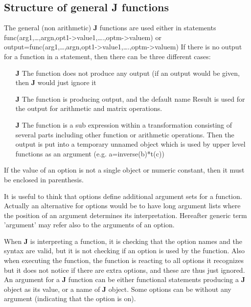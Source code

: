 \subsection{Structure of general \textbf{J} functions}
\label{jfunc}
The general (non arithmetic) \textbf{J} functions are used either in statements
func(arg1,…,argn,opt1->value1,….,optm->valuem)
or
output=func(arg1,…,argn,opt1->value1,….,optm->valuem)
If there is no output for a function in a statement, then there can be three different cases:
\begin{itemize}
\item[\textbf{J}] The function does not produce any output (if an output would be given, then \textbf{J} would just
ignore it
\item[\textbf{J}] The function is producing output, and the default name {Result} is used for the output
for arithmetic and matrix operations.
\item[\textbf{J}] The function is a sub expression within a transformation consisting of several parts including
other function or arithmetic operations. Then the output is put into a temporary unnamed
object which is used by upper level functions as an argument (e.g. a=\textcolor{VioletRed}{inverse}(b)*t(c))
\end{itemize}
If the value of an option is not a single object or numeric constant, then it must be enclosed in
parenthesis.
\begin{note}
It is useful to think that options define additional argument sets for a function. Actually
an alternative for options would be to have long argument lists where the position of an
argument determines its interpretation. Hereafter generic term 'argument' may refer also to
the arguments of an option.
\end{note}
\begin{note}
When \textbf{J} is interpreting a function, it is checking that the option names and the syntax
are valid, but it is not checking if an option is used by the function. Also when executing the
function, the function is reacting to all options it recognizes but it does not notice if there are
extra options, and these are thus just ignored.
An argument for a \textbf{J} function can be either functional statements producing a \textbf{J} object as its
value, or a name of \textbf{J} object. Some options can be without any argument (indicating that the
option is on).
\end{note}
